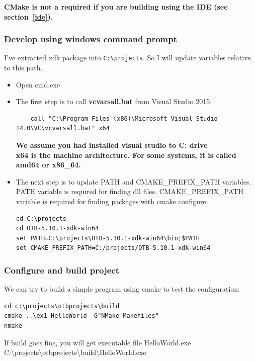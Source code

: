 \documentclass[10pt,a4paper]{article}
\begin{document}
\textbf{CMake is not a required if you are building using the IDE (see section~\ref{ide}).}

\subsubsection{Develop using windows command prompt}
I've extracted xdk package into \texttt{C:{\textbackslash}projects}. So I will
update variables relative to this path.

\begin{itemize}
  \item Open cmd.exe
  \item The first step is to call \textbf{vcvarsall.bat} from Visual Studio 2015:
  \begin{verbatim}
    call "C:\Program Files (x86)\Microsoft Visual Studio 14.0\VC\vcvarsall.bat" x64
  \end{verbatim}
  \textbf{We assume you had installed visual studio to C: drive} \\
  \textbf{x64 is the machine architecture. For some systems, it is called amd64 or
  x86\_64.}
  \item The next step is to update PATH and CMAKE\_PREFIX\_PATH variables. PATH variable
is required for finding dll files. CMAKE\_PREFIX\_PATH variable is required for
finding packages with cmake configure:
\begin{verbatim}
cd C:\projects
cd OTB-5.10.1-xdk-win64 
set PATH=C:\projects\OTB-5.10.1-xdk-win64\bin;$PATH
set CMAKE_PREFIX_PATH=C:/projects/OTB-5.10.1-xdk-win64
\end{verbatim}

\end{itemize}
  
\subsubsection{Configure and build project}

We can try to build a simple program using cmake to test the configuration:

\begin{verbatim}
cd c:\projects\otbprojects\build
cmake ..\ex1_HelloWorld -G"NMake Makefiles"
nmake
\end{verbatim}
If build goes fine, you will get executable file HelloWorld.exe
\newline
C:{\textbackslash}projects{\textbackslash}otbprojects{\textbackslash}build{\textbackslash}HelloWorld.exe
\newline
\end{document}
